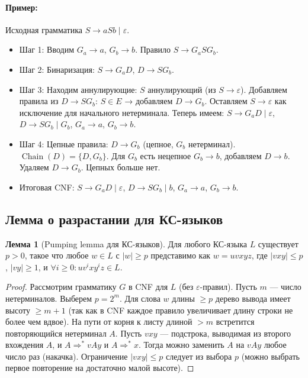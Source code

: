 \documentclass[12pt,a4paper]{article}
\theoremstyle{definition}
\newtheorem{lemma}{Лемма}[section]
\newcommand{\emptystring}{\varepsilon}
\begin{document}
\paragraph{Пример:}
Исходная грамматика $S \to aSb \mid \varepsilon$.
\begin{itemize}
\item Шаг 1: Вводим $G_a \to a$, $G_b \to b$. Правило $S \to G_a S G_b$.
\item Шаг 2: Бинаризация: $S \to G_a D$, $D \to S G_b$.
\item Шаг 3: Находим аннулирующие: $S$ аннулирующий (из $S\to\varepsilon$).
   Добавляем правила из $D \to S G_b$: $S\in E$ → добавляем $D \to G_b$.
   Оставляем $S\to\varepsilon$ как исключение для начального нетерминала.
   Теперь имеем: $S \to G_a D \mid \varepsilon$, $D \to S G_b \mid G_b$, $G_a\to a$, $G_b\to b$.
\item Шаг 4: Цепные правила: $D \to G_b$ (цепное, $G_b$ нетерминал). $\operatorname{Chain}(D)=\{D, G_b\}$. Для $G_b$ есть нецепное $G_b\to b$, добавляем $D\to b$. Удаляем $D\to G_b$. Цепных больше нет.
\item Итоговая CNF: $S \to G_a D \mid \varepsilon$, $D \to S G_b \mid b$, $G_a \to a$, $G_b \to b$.
\end{itemize}
\subsection{Лемма о разрастании для КС-языков}\label{sec:pumping-cfl}
\begin{lemma}[Pumping lemma для КС-языков]
Для любого КС-языка $L$ существует $p>0$, такое что любое $w\in L$ с $|w|\ge p$ представимо как $w=uvxyz$, где $|vxy|\le p$, $|vy|\ge1$, и $\forall i\ge0: uv^ixy^iz\in L$.
\end{lemma}

\begin{proof}
Рассмотрим грамматику $G$ в CNF для $L$ (без $\emptystring$-правил). Пусть $m$ --- число нетерминалов. Выберем $p=2^m$. Для слова $w$ длины $\ge p$ дерево вывода имеет высоту $\ge m+1$ (так как в CNF каждое правило увеличивает длину строки не более чем вдвое). На пути от корня к листу длиной $>m$ встретится повторяющийся нетерминал $A$. Пусть $vxy$ --- подстрока, выводимая из второго вхождения $A$, и $A\Rightarrow^* vAy$ и $A\Rightarrow^* x$. Тогда можно заменить $A$ на $vAy$ любое число раз (накачка). Ограничение $|vxy|\le p$ следует из выбора $p$ (можно выбрать первое повторение на достаточно малой высоте).
\end{proof}
\end{document}
